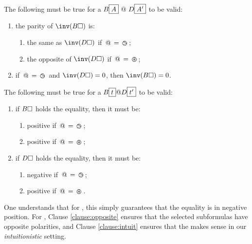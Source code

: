 \begin{condition}[Polarity]\label{cond:pol}
  
  The following must be true for a 
  $B\fbox{$A$}\operatorname{\,@\,} D\fbox{$A'$}$ to be valid:

  \begin{enumerate}
    \item the parity of $\inv(B\hole)$ is:

      \begin{enumerate}
        \item the same as $\inv(D\hole)$ if $\operatorname{\,@\,} = \operatorname{\,\varogreaterthan\,}$;
        \item the opposite of $\inv(D\hole)$ if $\operatorname{\,@\,} = \operatorname{\,\varoast\,}$;
      \end{enumerate}\label{clause:opposite}

    \item if $\operatorname{\,@\,} = \operatorname{\,\varogreaterthan\,}$ and $\inv(D\hole) = 0$, then $\inv(B\hole) =
    0$\label{clause:intuit}.
  \end{enumerate}

  The following must be true for a  $B\fbox{$t$} @ D\fbox{$t'$}$
  to be valid:

  \begin{enumerate}
    \item if $B\square$ holds the equality, then it must be:

      \begin{enumerate}
        \item positive if $\operatorname{\,@\,} = \operatorname{\,\varogreaterthan\,}$;
        \item positive if $\operatorname{\,@\,} = \operatorname{\,\varoast\,}$;
      \end{enumerate}

    \item if $D\square$ holds the equality, then it must be:

      \begin{enumerate} 
        \item negative if $\operatorname{\,@\,} = \operatorname{\,\varogreaterthan\,}$;
        \item positive if $\operatorname{\,@\,} = \operatorname{\,\varoast\,}$.
      \end{enumerate}

  \end{enumerate}
\end{condition}

One understands that for , this simply guarantees that the
equality is in negative position. For , Clause
\ref{clause:opposite} ensures that the selected subformulas have opposite
polarities, and Clause \ref{clause:intuit} ensures that the  makes sense
in our \emph{intuitionistic} setting.

